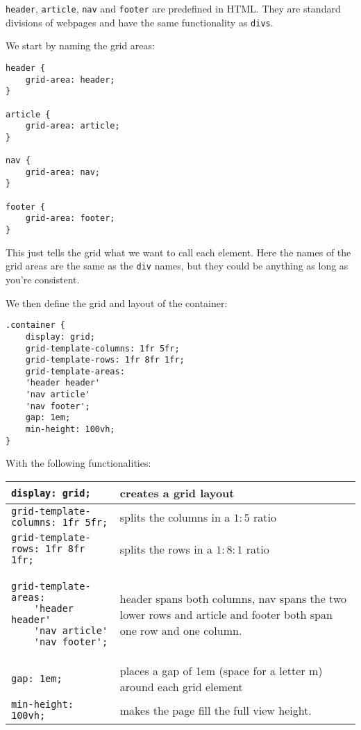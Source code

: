 \documentclass[11pt,a4paper]{report}
\begin{document}
\verb|header|, \verb|article|, \verb|nav| and \verb|footer| are predefined in HTML. They are standard divisions of webpages and have the same functionality as \verb|divs|.

We start by naming the grid areas: 
\begin{lstlisting}
header {
    grid-area: header;
}

article {
    grid-area: article;
}

nav {
    grid-area: nav;
}

footer {
    grid-area: footer;
}
\end{lstlisting}
This just tells the grid what we want to call each element. Here the names of the grid areas are the same as the \verb|div| names, but they could be anything as long as you're consistent.

We then define the grid and layout of the container: 
\begin{lstlisting}
.container {
    display: grid;
    grid-template-columns: 1fr 5fr;
    grid-template-rows: 1fr 8fr 1fr;
    grid-template-areas: 
    'header header'
    'nav article'
    'nav footer';
    gap: 1em;
    min-height: 100vh;
}
\end{lstlisting}
With the following functionalities: 
\begin{center}
\begin{tabular}{p{}|p{}}
\verb|display: grid;| & creates a grid layout \\
\hline
\verb|grid-template-columns: 1fr 5fr;| & splits the columns in a $1:5$ ratio \\
\hline
\verb|grid-template-rows: 1fr 8fr 1fr;| & splits the rows in a $1:8:1$ ratio \\
\hline
\begin{verbatim}
grid-template-areas: 
    'header header'
    'nav article'
    'nav footer';
\end{verbatim} & header spans both columns,  
nav spans the two lower rows 
and article and footer both span one row and one column.  \\
\hline
\verb|gap: 1em;| & places a gap of 1em (space for a letter m) around each grid element\\
\hline
\verb|min-height: 100vh;| & makes the page fill the full view height.
\end{tabular}
\end{center}
\end{document}
